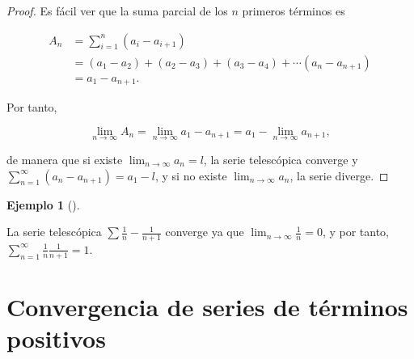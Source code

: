 \documentclass[
  a4paper,
]{scrreport}
\theoremstyle{plain}
\theoremstyle{plain}
\theoremstyle{definition}
\theoremstyle{plain}
\theoremstyle{definition}
\newtheorem{example}{Ejemplo}[chapter]
\theoremstyle{remark}
\begin{document}
\begin{tcolorbox}[enhanced jigsaw, title=\textcolor{quarto-callout-note-color}{\faInfo}\hspace{0.5em}{Demostración}, opacityback=0, titlerule=0mm, colback=white, opacitybacktitle=0.6, colbacktitle=quarto-callout-note-color!10!white, breakable, left=2mm, bottomtitle=1mm, toptitle=1mm, coltitle=black, arc=.35mm, leftrule=.75mm, toprule=.15mm, rightrule=.15mm, bottomrule=.15mm, colframe=quarto-callout-note-color-frame]

\begin{proof}

Es fácil ver que la suma parcial de los \(n\) primeros términos es

\begin{align*}
A_n &= \sum_{i=1}^n (a_i-a_{i+1})\\ 
& = (a_1-a_2)+(a_2-a_3)+(a_3-a_4)+\cdots (a_n-a_{n+1})\\ 
& = a_1-a_{n+1}.
\end{align*}

Por tanto,

\[
\lim_{n\to\infty} A_n = \lim_{n\to\infty} a_1-a_{n+1} = a_1 - \lim_{n\to\infty} a_{n+1},
\]

de manera que si existe \(\lim_{n\to\infty} a_n=l\), la serie
telescópica converge y \(\sum_{n=1}^\infty (a_n-a_{n+1}) = a_1-l\), y si
no existe \(\lim_{n\to\infty} a_n\), la serie diverge.

\end{proof}

\end{tcolorbox}

\leavevmode{}%
\begin{example}[]\label{exm-convergencia-series-telescopicas}

La serie telescópica \(\sum \frac{1}{n}-\frac{1}{n+1}\) converge ya que
\(\lim_{n\to\infty}\frac{1}{n} = 0\), y por tanto,
\(\sum_{n=1}^\infty \frac{1}{n}\frac{1}{n+1} = 1\).

\end{example}

\hypertarget{convergencia-de-series-de-tuxe9rminos-positivos}{%
\section{Convergencia de series de términos
positivos}\label{convergencia-de-series-de-tuxe9rminos-positivos}}
\end{document}
